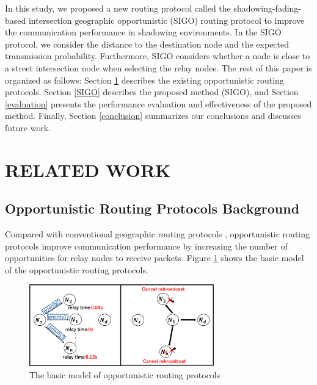 \documentclass[conference]{IEEEtran}
\begin{document}
In this study, we proposed a new routing protocol called the shadowing-fading-based intersection geographic opportunistic (SIGO) routing protocol to improve the communication performance in shadowing environments. In the SIGO protocol, we consider the distance to the destination node and the expected transmission probability. Furthermore, SIGO considers whether a node is close to a street intersection node when selecting the relay nodes.  The rest of this paper is organized as follows:
Section \ref{relatedSection} describes the existing opportunistic routing protocols.
Section \ref{SIGO} describes the proposed method (SIGO), and Section \ref{evaluation} presents the performance evaluation and effectiveness of the proposed method. Finally, Section \ref{conclusion} summarizes our conclusions and discusses future work.





\section{RELATED WORK} %
\label{relatedSection}

\subsection{Opportunistic Routing Protocols Background}

Compared with conventional geographic routing protocols \cite{6}, opportunistic routing protocols improve communication performance by increasing the number of opportunities for relay nodes to receive packets. Figure \ref{fig:Basic} shows the basic model of the opportunistic routing protocols.

\begin{figure}[!ht]
\centering
\includegraphics[width=80mm]{figures/basic-opportunity2.eps}
\caption{The basic model of opportunistic routing protocols}
\label{fig:Basic}
\end{figure}
\end{document}
